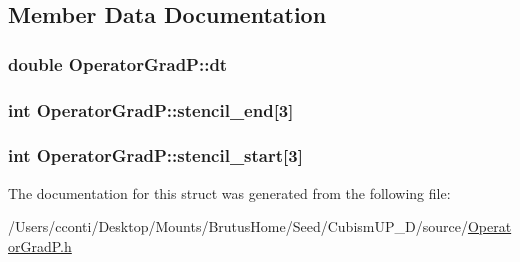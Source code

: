 \subsection{Member Data Documentation}
\hypertarget{struct_operator_grad_p_a86a7e584cdd5928d1bc34fecd276783e}{}
\subsubsection[{dt}]{\setlength{\rightskip}{0pt plus 5cm}double Operator\+Grad\+P\+::dt}\label{struct_operator_grad_p_a86a7e584cdd5928d1bc34fecd276783e}
\hypertarget{struct_operator_grad_p_a62999b18820358c568c86636716379f7}{}
\subsubsection[{stencil\+\_\+end}]{\setlength{\rightskip}{0pt plus 5cm}int Operator\+Grad\+P\+::stencil\+\_\+end\mbox{[}3\mbox{]}}\label{struct_operator_grad_p_a62999b18820358c568c86636716379f7}
\hypertarget{struct_operator_grad_p_ab5d816eb1f3e6fea8946e0a31869e51f}{}
\subsubsection[{stencil\+\_\+start}]{\setlength{\rightskip}{0pt plus 5cm}int Operator\+Grad\+P\+::stencil\+\_\+start\mbox{[}3\mbox{]}}\label{struct_operator_grad_p_ab5d816eb1f3e6fea8946e0a31869e51f}


The documentation for this struct was generated from the following file\+:\begin{DoxyCompactItemize}
\item 
/\+Users/cconti/\+Desktop/\+Mounts/\+Brutus\+Home/\+Seed/\+Cubism\+U\+P\+\_\+D/source/\hyperlink{_operator_grad_p_8h}{Operator\+Grad\+P.\+h}\end{DoxyCompactItemize}
